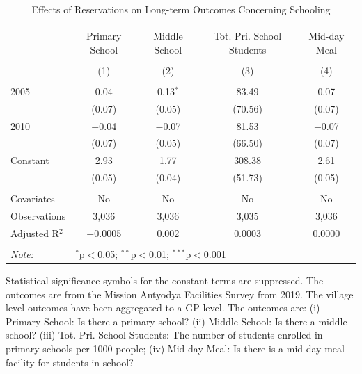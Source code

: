 \begin{table}[!htbp]
\centering
\begin{threeparttable}

  \caption{Effects of Reservations on Long-term Outcomes Concerning Schooling} 
  \label{raj_shrug_schooling_05_10} 
\scriptsize 
\begin{tabular}{@{\extracolsep{0pt}}lcccc} 
\\[-1.8ex]\hline 
\hline \\[-1.8ex] 
 & Primary School & Middle School & Tot. Pri. School Students & Mid-day Meal \\ 
\\[-1.8ex] & (1) & (2) & (3) & (4)\\ 
\hline \\[-1.8ex] 
 2005 & 0.04 & 0.13$^{*}$ & 83.49 & 0.07 \\ 
  & (0.07) & (0.05) & (70.56) & (0.07) \\ 
  2010 & $-$0.04 & $-$0.07 & 81.53 & $-$0.07 \\ 
  & (0.07) & (0.05) & (66.50) & (0.07) \\ 
  Constant & 2.93 & 1.77 & 308.38 & 2.61 \\ 
  & (0.05) & (0.04) & (51.73) & (0.05) \\ 
 \hline \\[-1.8ex] 
Covariates & No & No & No & No \\ 
Observations & 3,036 & 3,036 & 3,035 & 3,036 \\ 
Adjusted R$^{2}$ & $-$0.0005 & 0.002 & 0.0003 & 0.0000 \\ 
\hline 
\hline \\[-1.8ex] 
\textit{Note:}  & \multicolumn{4}{l}{$^{*}$p$<$0.05; $^{**}$p$<$0.01; $^{***}$p$<$0.001} \\ 
\end{tabular} 
\begin{tablenotes}[flushleft]
\scriptsize
\item[] Statistical significance symbols for the constant terms are suppressed. The outcomes are from the Mission Antyodya Facilities Survey from 2019.
                     The village level outcomes have been aggregated to a GP level.
                     The outcomes are:
                         (i) Primary School: Is there a primary school?
                         (ii) Middle School: Is there a middle school?
                         (iii) Tot. Pri. School Students: The number of students enrolled in primary schools per 1000 people;
                         (iv) Mid-day Meal: Is there is a mid-day meal facility for students in school?
\end{tablenotes}
\end{threeparttable}
\end{table}
